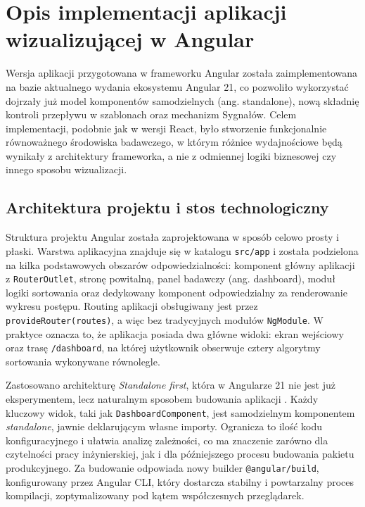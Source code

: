 \documentclass[12pt,openright,twoside]{report}
\begin{document}
\section{Opis implementacji aplikacji wizualizującej w Angular}
Wersja aplikacji przygotowana w frameworku Angular została zaimplementowana na bazie aktualnego wydania ekosystemu Angular 21, co pozwoliło wykorzystać dojrzały już model komponentów samodzielnych (ang. standalone), nową składnię kontroli przepływu w szablonach oraz mechanizm Sygnałów. Celem implementacji, podobnie jak w wersji React, było stworzenie funkcjonalnie równoważnego środowiska badawczego, w którym różnice wydajnościowe będą wynikały z architektury frameworka, a nie z odmiennej logiki biznesowej czy innego sposobu wizualizacji.

\subsection{Architektura projektu i stos technologiczny}
Struktura projektu Angular została zaprojektowana w sposób celowo prosty i płaski. Warstwa aplikacyjna znajduje się w katalogu \texttt{src/app} i została podzielona na kilka podstawowych obszarów odpowiedzialności: komponent główny aplikacji z \texttt{RouterOutlet}, stronę powitalną, panel badawczy (ang. dashboard), moduł logiki sortowania oraz dedykowany komponent odpowiedzialny za renderowanie wykresu postępu. Routing aplikacji obsługiwany jest przez \texttt{provideRouter(routes)}, a więc bez tradycyjnych modułów \texttt{NgModule}. W praktyce oznacza to, że aplikacja posiada dwa główne widoki: ekran wejściowy oraz trasę \texttt{/dashboard}, na której użytkownik obserwuje cztery algorytmy sortowania wykonywane równolegle.

Zastosowano architekturę \textit{Standalone first}, która w Angularze 21 nie jest już eksperymentem, lecz naturalnym sposobem budowania aplikacji \cite{Angular_Docs}. Każdy kluczowy widok, taki jak \texttt{DashboardComponent}, jest samodzielnym komponentem \textit{standalone}, jawnie deklarującym własne importy. Ogranicza to ilość kodu konfiguracyjnego i ułatwia analizę zależności, co ma znaczenie zarówno dla czytelności pracy inżynierskiej, jak i dla późniejszego procesu budowania pakietu produkcyjnego. Za budowanie odpowiada nowy builder \texttt{@angular/build}, konfigurowany przez Angular CLI, który dostarcza stabilny i powtarzalny proces kompilacji, zoptymalizowany pod kątem współczesnych przeglądarek.
\end{document}
